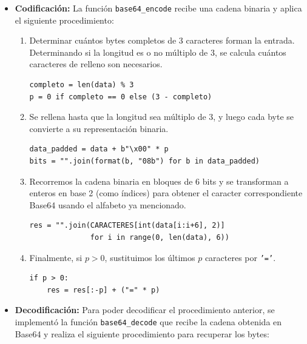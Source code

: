 \documentclass[12pt, a4paper]{article}
\begin{document}
\begin{itemize}
    \item \textbf{Codificación:} La función \texttt{base64\_encode} recibe una cadena binaria y aplica el siguiente
    procedimiento:

    \begin{enumerate}
        \item Determinar cuántos bytes completos de 3 caracteres forman la entrada. Determinando si la longitud es o no
        múltiplo de $3$, se calcula cuántos caracteres de relleno son necesarios.

\begin{verbatim}
completo = len(data) % 3
p = 0 if completo == 0 else (3 - completo)
\end{verbatim}

    \item Se rellena hasta que la longitud sea múltiplo de 3, y luego cada byte se convierte a su representación 
    binaria.
    
\begin{verbatim}
data_padded = data + b"\x00" * p
bits = "".join(format(b, "08b") for b in data_padded)
\end{verbatim}

    \item Recorremos la cadena binaria en bloques de 6 bits y se transforman a enteros en base 2 (como índices) 
    para obtener el caracter correspondiente Base64 usando el alfabeto ya mencionado.

\begin{verbatim}
res = "".join(CARACTERES[int(data[i:i+6], 2)]
              for i in range(0, len(data), 6))
\end{verbatim}

    \item Finalmente, si $p > 0$, sustituimos los últimos $p$ caracteres por \texttt{'='}.

\begin{verbatim}
if p > 0:
    res = res[:-p] + ("=" * p)
\end{verbatim}

    \end{enumerate}


    \item \textbf{Decodificación:} Para poder decodificar el procedimiento anterior, se implementó la función
    \texttt{base64\_decode} que recibe la cadena obtenida en Base64 y realiza el siguiente procedimiento para 
    recuperar los bytes:


\end{itemize}
\end{document}
